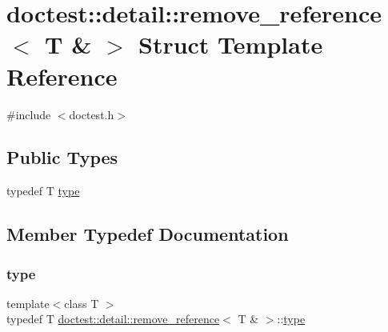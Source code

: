\hypertarget{structdoctest_1_1detail_1_1remove__reference_3_01_t_01_6_01_4}{}\section{doctest\+:\+:detail\+:\+:remove\+\_\+reference$<$ T \& $>$ Struct Template Reference}
\label{structdoctest_1_1detail_1_1remove__reference_3_01_t_01_6_01_4}


{\ttfamily \#include $<$doctest.\+h$>$}

\subsection*{Public Types}
\begin{DoxyCompactItemize}
\item 
typedef T \hyperlink{structdoctest_1_1detail_1_1remove__reference_3_01_t_01_6_01_4_a37201537c0190f14f504d9f507bc042a}{type}
\end{DoxyCompactItemize}


\subsection{Member Typedef Documentation}
\mbox{\label{structdoctest_1_1detail_1_1remove__reference_3_01_t_01_6_01_4_a37201537c0190f14f504d9f507bc042a}} 
\subsubsection{\texorpdfstring{type}{type}}
{\footnotesize\ttfamily template$<$class T $>$ \\
typedef T \hyperlink{structdoctest_1_1detail_1_1remove__reference}{doctest\+::detail\+::remove\+\_\+reference}$<$ T \& $>$\+::\hyperlink{structdoctest_1_1detail_1_1remove__reference_3_01_t_01_6_01_4_a37201537c0190f14f504d9f507bc042a}{type}}

